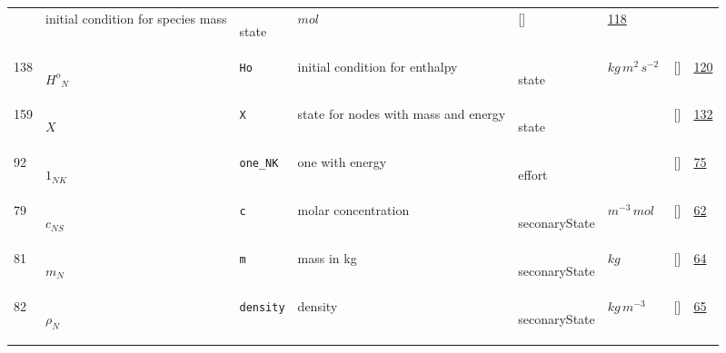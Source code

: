 \begin{longtable}{|p{1cm}|p{3cm}|p{3cm}|p{7cm}|p{3.0cm}|p{3cm}|p{2cm}|p{1cm}|}
             & initial condition for species mass
             & \begin{lay}state \end{lay}
             & $ mol \, $
             & []
             & \hyperlink{"e:118"}{ 118 }
                 \\
    138
             & \hypertarget{"v:138"}{ $ {H^{o}}_{N} $}
             & \verb|Ho|
             & initial condition for enthalpy
             & \begin{lay}state \end{lay}
             & $ kg \,m^{2} \,s^{-2} \, $
             & []
             & \hyperlink{"e:120"}{ 120 }
                 \\
    159
             & \hypertarget{"v:159"}{ $ {X}_{} $}
             & \verb|X|
             & state for nodes with mass and energy
             & \begin{lay}state \end{lay}
             & $  $
             & []
             & \hyperlink{"e:132"}{ 132 }
                 \\
    92
             & \hypertarget{"v:92"}{ $ {1}_{{N K}} $}
             & \verb|one_NK|
             & one with energy
             & \begin{lay}effort \end{lay}
             & $  $
             & []
             & \hyperlink{"e:75"}{ 75 }
                 \\
    79
             & \hypertarget{"v:79"}{ $ {c}_{{N S}} $}
             & \verb|c|
             & molar concentration
             & \begin{lay}seconaryState \end{lay}
             & $ m^{-3} \,mol \, $
             & []
             & \hyperlink{"e:62"}{ 62 }
                 \\
    81
             & \hypertarget{"v:81"}{ $ {m}_{N} $}
             & \verb|m|
             & mass in kg
             & \begin{lay}seconaryState \end{lay}
             & $ kg \, $
             & []
             & \hyperlink{"e:64"}{ 64 }
                 \\
    82
             & \hypertarget{"v:82"}{ $ {\rho}_{N} $}
             & \verb|density|
             & density
             & \begin{lay}seconaryState \end{lay}
             & $ kg \,m^{-3} \, $
             & []
             & \hyperlink{"e:65"}{ 65 }

\end{longtable}
